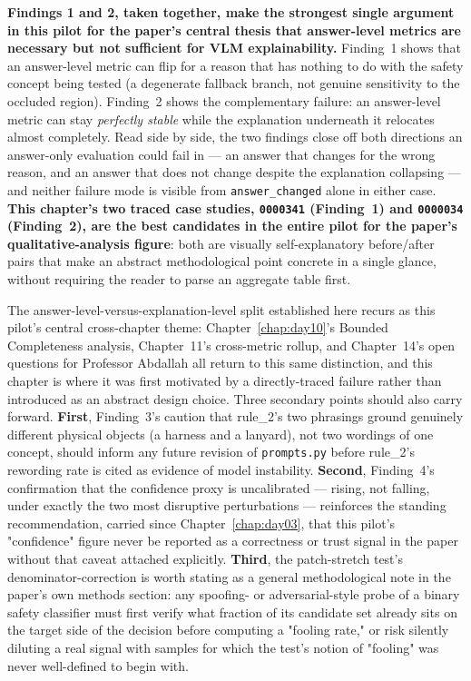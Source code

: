 \textbf{Findings 1 and 2, taken together, make the strongest single argument in this pilot for the
paper's central thesis that answer-level metrics are necessary but not sufficient for VLM
explainability.} Finding~1 shows that an answer-level metric can flip for a reason that has nothing
to do with the safety concept being tested (a degenerate fallback branch, not genuine sensitivity to
the occluded region). Finding~2 shows the complementary failure: an answer-level metric can stay
\emph{perfectly stable} while the explanation underneath it relocates almost completely. Read
side by side, the two findings close off both directions an answer-only evaluation could fail in ---
an answer that changes for the wrong reason, and an answer that does not change despite the
explanation collapsing --- and neither failure mode is visible from \texttt{answer\_changed} alone in
either case. \textbf{This chapter's two traced case studies, \texttt{0000341} (Finding~1) and
\texttt{0000034} (Finding~2), are the best candidates in the entire pilot for the paper's
qualitative-analysis figure}: both are visually self-explanatory before/after pairs that make an
abstract methodological point concrete in a single glance, without requiring the reader to parse an
aggregate table first.

The answer-level-versus-explanation-level split established here recurs as this pilot's central
cross-chapter theme: Chapter~\ref{chap:day10}'s Bounded Completeness analysis, Chapter~11's
cross-metric rollup, and Chapter~14's open questions for Professor Abdallah all return to this same
distinction, and this chapter is where it was first motivated by a directly-traced failure rather than
introduced as an abstract design choice. Three secondary points should also carry forward.
\textbf{First}, Finding~3's caution that rule\_2's two phrasings ground genuinely different physical
objects (a harness and a lanyard), not two wordings of one concept, should inform any future revision
of \texttt{prompts.py} before rule\_2's rewording rate is cited as evidence of model instability.
\textbf{Second}, Finding~4's confirmation that the confidence proxy is uncalibrated --- rising, not
falling, under exactly the two most disruptive perturbations --- reinforces the standing
recommendation, carried since Chapter~\ref{chap:day03}, that this pilot's "confidence" figure never
be reported as a correctness or trust signal in the paper without that caveat attached explicitly.
\textbf{Third}, the patch-stretch test's denominator-correction is worth stating as a general
methodological note in the paper's own methods section: any spoofing- or adversarial-style probe of a
binary safety classifier must first verify what fraction of its candidate set already sits on the
target side of the decision before computing a "fooling rate," or risk silently diluting a real
signal with samples for which the test's notion of "fooling" was never well-defined to begin with.
